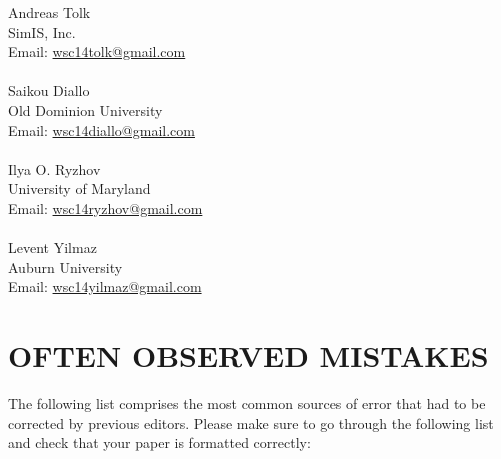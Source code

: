 \documentclass{wscpaperproc}
\theoremstyle{wsc}
\begin{document}
\noindent Andreas Tolk\\
SimIS, Inc.\\
Email: \href{mailto://wsc14tolk@gmail.com}{wsc14tolk@gmail.com}\\
\\
Saikou Diallo\\
Old Dominion University\\
Email: \href{mailto://wsc14diallo@gmail.com}{wsc14diallo@gmail.com}\\
\\
Ilya O. Ryzhov\\
University of Maryland\\
Email: \href{mailto://wsc14ryzhov@gmail.com}{wsc14ryzhov@gmail.com}\\
\\
Levent Yilmaz\\
Auburn University\\
Email: \href{mailto://wsc14yilmaz@gmail.com}{wsc14yilmaz@gmail.com}\\

\section{OFTEN OBSERVED MISTAKES}

The following list comprises the most common sources of error that had to be corrected by previous editors. Please make sure to go through the following list and check that your paper is formatted correctly:
\end{document}
